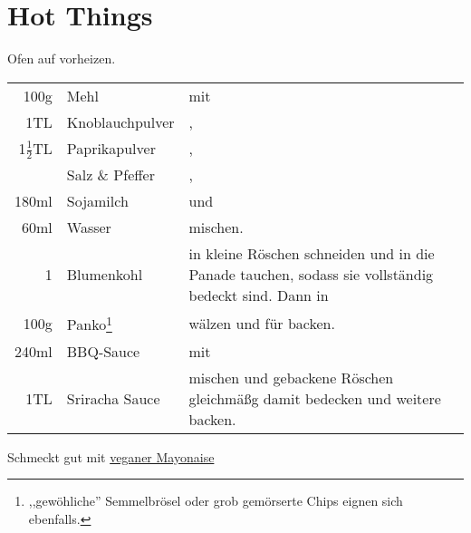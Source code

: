 \section{Hot Things}\label{sec:hot_things}
Ofen auf  vorheizen.
\begin{longtable}{rlL{16.75cm}}
    100g                &   Mehl            &   mit \\
    1TL                 &   Knoblauchpulver &   ,   \\
    1$\frac{1}{2}$TL    &   Paprikapulver   &   ,   \\
                        &   Salz \& Pfeffer &   ,   \\
    180ml               &   Sojamilch       &   und \\
    60ml                &   Wasser          &   mischen.    \\
    1                   &   Blumenkohl      &   in kleine Röschen schneiden und in die Panade tauchen, sodass sie vollständig bedeckt sind.
                                                Dann in \\
    100g                &   Panko\footnote{,,gewöhliche'' Semmelbrösel oder grob gemörserte Chips eignen sich ebenfalls.}
                                            &   wälzen und für  backen.    \\
    240ml               &   BBQ-Sauce       &   mit \\
    1TL                 &   Sriracha Sauce  &   mischen und gebackene Röschen gleichmäßg damit bedecken und weitere  backen.\\
\end{longtable}

Schmeckt gut mit \hyperref[sec:vegan_mayo]{veganer Mayonaise}